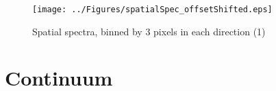 \documentclass[]{emulateapj}
\begin{document}
\begin{figure}[tbph]
\centering
\texttt{[image: ../Figures/spatialSpec\_offsetShifted.eps]}       %
\caption{ 
Spatial spectra, binned by 3 pixels in each direction (1)
 \label{fig:spatialSpec}}
\end{figure}

%

\section{Continuum}

%




\end{document}
